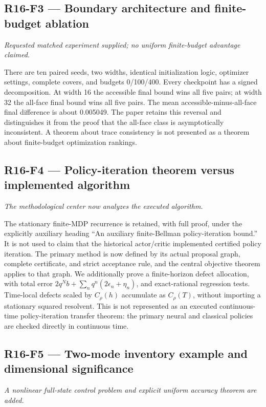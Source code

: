 \documentclass[ecta]{econsocart}
\theoremstyle{remark}
\begin{document}
\subsection{R16-F3 --- Boundary architecture and finite-budget ablation}
\noindent\emph{Requested matched experiment supplied; no uniform finite-budget advantage claimed.}

There are ten paired seeds, two widths, identical initialization logic, optimizer settings, complete covers, and budgets 0/100/400. Every checkpoint has a signed decomposition. At width 16 the accessible final bound wins all five pairs; at width 32 the all-face final bound wins all five pairs. The mean accessible-minus-all-face final difference is about 0.005049. The paper retains this reversal and distinguishes it from the proof that the all-face class is asymptotically inconsistent. A theorem about trace consistency is not presented as a theorem about finite-budget optimization rankings.

\subsection{R16-F4 --- Policy-iteration theorem versus implemented algorithm}
\noindent\emph{The methodological center now analyzes the executed algorithm.}

The stationary finite-MDP recurrence is retained, with full proof, under the explicitly auxiliary heading “An auxiliary finite-Bellman policy-iteration bound.” It is not used to claim that the historical actor/critic implemented certified policy iteration. The primary method is now defined by its actual proposal graph, complete certificate, and strict acceptance rule, and the central objective theorem applies to that graph. We additionally prove a finite-horizon defect allocation, with total error $2q^Nb+\sum_n q^n(2\epsilon_n+\eta_n)$, and exact-rational regression tests. Time-local defects scaled by $C_\rho(h)$ accumulate as $C_\rho(T)$, without importing a stationary squared resolvent. This is not represented as an executed continuous-time policy-iteration transfer theorem: the primary neural and classical policies are checked directly in continuous time.

\subsection{R16-F5 --- Two-mode inventory example and dimensional significance}
\noindent\emph{A nonlinear full-state control problem and explicit uniform accuracy theorem are added.}
\end{document}

